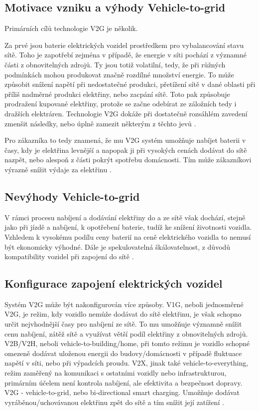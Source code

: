\documentclass[12pt,a4paper]{Cotmas-2018}
\begin{document}
\subsection{Motivace vzniku a výhody Vehicle-to-grid}
Primárních cílů technologie V2G je několik.

Za prvé jsou baterie elektrických vozidel prostředkem pro vybalancování stavu sítě. Toho je zapotřebí zejména v případě, že energie v síti pochází z významné části z obnovitelných zdrojů. Ty jsou totiž volatilní, tedy, že při růžných podmínkách mohou produkovat značně rozdílné množství energie. To může způsobit snížení napětí při nedostatečné produkci, přetížení sítě v dané oblasti při příliš nadměrné produkci elektřiny, nebo zacpání sítě. Toto pak způsobuje prodražení kupované elektřiny, protože se začne odebírat ze záložních tedy i dražších elektráren. Technologie V2G dokáže při dostatečně rozsáhlém zavedení zmenšit následky, nebo úplně zamezit některým z těchto jevů 
\cite{Greaker-Hagem-Proost-2022}.

Pro zákazníka to tedy znamená, že mu V2G systém umožňuje nabíjet baterii v časy, kdy je elektřina levnější a napopak ji při vysokých cenách dodávat do sítě nazpět, nebo alespoň z části pokrýt spotřebu domácnosti. Tím může zákazníkovi výrazně snížit výdaje za elektřinu 
\cite{Virta-Ltd-2021}.

\subsection{Nevýhody Vehicle-to-grid}
V rámci procesu nabíjení a dodávání elektřiny do a ze sítě však dochází, stejně jako při jízdě a nabíjení, k opotřebení baterie, tudíž ke snížení životnosti vozidla. Vzhledem k vysokému podílu ceny baterií na ceně elektrického vozidla to nemusí být ekonomicky výhodné.
Dále je spekulovatelná škálovatelnost, z důvodů kompatibility vozidel při zapojení do sítě 
\cite{Lakshmi-Divya-Sravani-2019}.

\subsection{Konfigurace zapojení elektrických vozidel}
Systém V2G může být nakonfigurován více způsoby.
V1G, neboli jednosměrné V2G, je režim, kdy vozidlo nemůže dodávat do sítě elektřinu,
je však schopno určit nejvhodnější časy pro nabíjení ze sítě. To mu umožňuje významně snížit cenu nabíjení, zátěž sítě a využívat větší podíl elektřiny z obnovitelných zdrojů.
V2B/V2H, neboli vehicle-to-building/home, při tomto režimu je vozidlo schopné omezeně dodávat uloženou energii do budovy/domácnosti v případě fluktuace napětí v síti, nebo při výpadcích proudu.
V2X, jinak také vehicle-to-everything, režim zaměřený na komunikaci s ostatními vozidly nebo infrastrukturou, primárním účelem není kontrola nabíjení, ale efektivita a bezpečnost dopravy.
V2G - vehicle-to-grid, nebo bi-directional smart charging. Umožňuje dodávat vyráběnou/uchovávanou elektřinu zpět do sítě a tím snížit její zatížení 
\cite{Svarc-2022}.
\end{document}

